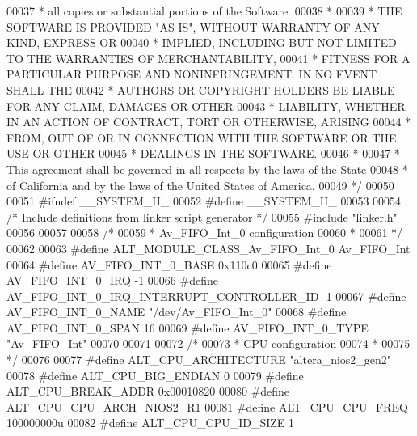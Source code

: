 \begin{DoxyCode}
00037 \textcolor{comment}{ * all copies or substantial portions of the Software.}
00038 \textcolor{comment}{ *}
00039 \textcolor{comment}{ * THE SOFTWARE IS PROVIDED "AS IS", WITHOUT WARRANTY OF ANY KIND, EXPRESS OR}
00040 \textcolor{comment}{ * IMPLIED, INCLUDING BUT NOT LIMITED TO THE WARRANTIES OF MERCHANTABILITY,}
00041 \textcolor{comment}{ * FITNESS FOR A PARTICULAR PURPOSE AND NONINFRINGEMENT. IN NO EVENT SHALL THE}
00042 \textcolor{comment}{ * AUTHORS OR COPYRIGHT HOLDERS BE LIABLE FOR ANY CLAIM, DAMAGES OR OTHER}
00043 \textcolor{comment}{ * LIABILITY, WHETHER IN AN ACTION OF CONTRACT, TORT OR OTHERWISE, ARISING}
00044 \textcolor{comment}{ * FROM, OUT OF OR IN CONNECTION WITH THE SOFTWARE OR THE USE OR OTHER}
00045 \textcolor{comment}{ * DEALINGS IN THE SOFTWARE.}
00046 \textcolor{comment}{ *}
00047 \textcolor{comment}{ * This agreement shall be governed in all respects by the laws of the State}
00048 \textcolor{comment}{ * of California and by the laws of the United States of America.}
00049 \textcolor{comment}{ */}
00050 
00051 \textcolor{preprocessor}{#ifndef \_\_SYSTEM\_H\_}
00052 \textcolor{preprocessor}{#define \_\_SYSTEM\_H\_}
00053 
00054 \textcolor{comment}{/* Include definitions from linker script generator */}
00055 \textcolor{preprocessor}{#include "linker.h"}
00056 
00057 
00058 \textcolor{comment}{/*}
00059 \textcolor{comment}{ * Av\_FIFO\_Int\_0 configuration}
00060 \textcolor{comment}{ *}
00061 \textcolor{comment}{ */}
00062 
00063 \textcolor{preprocessor}{#define ALT\_MODULE\_CLASS\_Av\_FIFO\_Int\_0 Av\_FIFO\_Int}
00064 \textcolor{preprocessor}{#define AV\_FIFO\_INT\_0\_BASE 0x110c0}
00065 \textcolor{preprocessor}{#define AV\_FIFO\_INT\_0\_IRQ -1}
00066 \textcolor{preprocessor}{#define AV\_FIFO\_INT\_0\_IRQ\_INTERRUPT\_CONTROLLER\_ID -1}
00067 \textcolor{preprocessor}{#define AV\_FIFO\_INT\_0\_NAME "/dev/Av\_FIFO\_Int\_0"}
00068 \textcolor{preprocessor}{#define AV\_FIFO\_INT\_0\_SPAN 16}
00069 \textcolor{preprocessor}{#define AV\_FIFO\_INT\_0\_TYPE "Av\_FIFO\_Int"}
00070 
00071 
00072 \textcolor{comment}{/*}
00073 \textcolor{comment}{ * CPU configuration}
00074 \textcolor{comment}{ *}
00075 \textcolor{comment}{ */}
00076 
00077 \textcolor{preprocessor}{#define ALT\_CPU\_ARCHITECTURE "altera\_nios2\_gen2"}
00078 \textcolor{preprocessor}{#define ALT\_CPU\_BIG\_ENDIAN 0}
00079 \textcolor{preprocessor}{#define ALT\_CPU\_BREAK\_ADDR 0x00010820}
00080 \textcolor{preprocessor}{#define ALT\_CPU\_CPU\_ARCH\_NIOS2\_R1}
00081 \textcolor{preprocessor}{#define ALT\_CPU\_CPU\_FREQ 100000000u}
00082 \textcolor{preprocessor}{#define ALT\_CPU\_CPU\_ID\_SIZE 1}

\end{DoxyCode}
